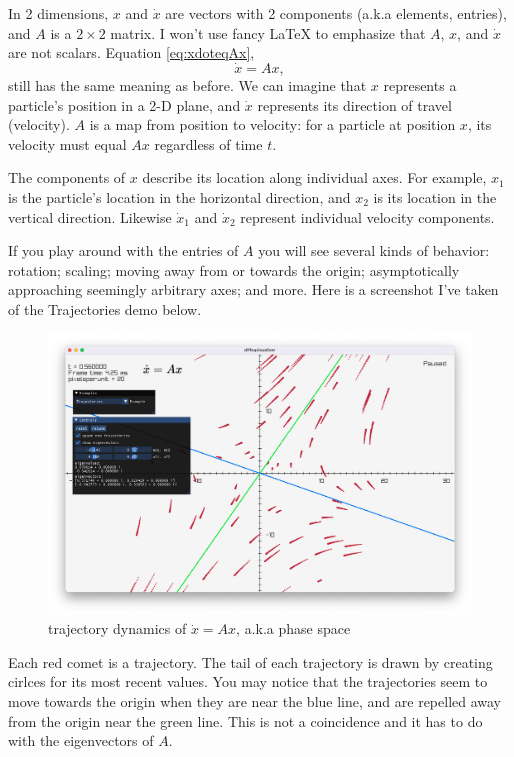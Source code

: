 \documentclass[11pt, oneside]{article}   	%
\begin{document}
In 2 dimensions, $x$ and $\dot{x}$ are vectors with 2 components (a.k.a elements, entries), and $A$ is a $2\times 2$ matrix.
I won't use fancy LaTeX to emphasize that $A$, $x$, and $\dot{x}$ are not scalars.
Equation \ref{eq:xdoteqAx},
$$ \dot{x} = Ax ,$$
still has the same meaning as before.
We can imagine that $x$ represents a particle's position in a 2-D plane,
and $\dot{x}$ represents its direction of travel (velocity).
$A$ is a map from position to velocity: for a particle at position $x$, its velocity must equal $Ax$ regardless of time $t$.

The components of $x$ describe its location along individual axes.
For example, $x_1$ is the particle's location in the horizontal direction,
and $x_2$ is its location in the vertical direction.
Likewise $\dot{x}_1$ and $\dot{x}_2$ represent individual velocity components.

If you play around with the entries of $A$ you will see several kinds of behavior:
rotation;
scaling;
moving away from or towards the origin;
asymptotically approaching seemingly arbitrary axes;
and more.
Here is a screenshot I've taken of the Trajectories demo below.

\begin{figure}[h]
\centering
\includegraphics[scale=0.31]{screenshot_trajectories}
\caption{trajectory dynamics of $\dot{x} = Ax$, a.k.a phase space}
\label{fig:Trajectories}
\end{figure}

Each red comet is a trajectory.
The tail of each trajectory is drawn by creating cirlces for its most recent values.
You may notice that the trajectories seem to move towards the origin when they are near the blue line,
and are repelled away from the origin near the green line.
This is not a coincidence and it has to do with the eigenvectors of $A$.
\end{document}
